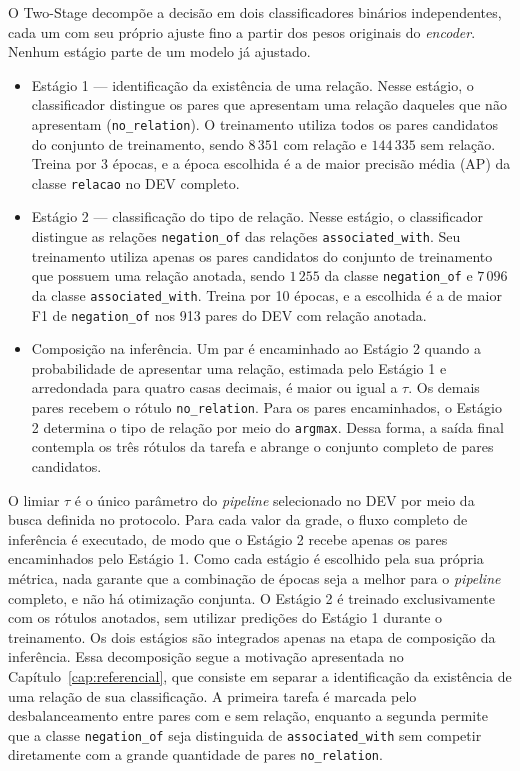 O Two-Stage decompõe a decisão em dois classificadores binários independentes, cada
um com seu próprio ajuste fino a partir dos pesos originais do
\emph{encoder}. Nenhum estágio parte de um modelo já ajustado.

\begin{itemize}
  \item Estágio 1 --- identificação da existência de uma relação. Nesse estágio, o classificador distingue os pares que apresentam uma relação daqueles que não apresentam (\texttt{no\_relation}). O treinamento utiliza todos os pares candidatos do conjunto de treinamento, sendo $8\,351$ com relação e $144\,335$ sem relação. Treina por 3 épocas, e a
        época escolhida é a de maior precisão média (AP) da classe \texttt{relacao}
        no DEV completo.
  \item Estágio 2 --- classificação do tipo de relação. Nesse estágio, o classificador distingue as relações \texttt{negation\_of} das relações \texttt{associated\_with}. Seu treinamento utiliza apenas os pares candidatos do conjunto de treinamento que possuem uma relação anotada, sendo $1\,255$ da classe \texttt{negation\_of} e $7\,096$ da classe \texttt{associated\_with}. Treina por 10 épocas, e a escolhida é
        a de maior F1 de \texttt{negation\_of} nos 913 pares do DEV com relação
        anotada.
  \item Composição na inferência. Um par é encaminhado ao Estágio 2 quando a probabilidade de apresentar uma relação, estimada pelo Estágio 1 e arredondada para quatro casas decimais, é maior ou igual a $\tau$. Os demais pares recebem o rótulo \texttt{no\_relation}. Para os pares encaminhados, o Estágio 2 determina o tipo de relação por meio do \texttt{argmax}. Dessa forma, a saída final contempla os três rótulos da tarefa e abrange o conjunto completo de pares candidatos.
\end{itemize}

O limiar $\tau$ é o único parâmetro do \emph{pipeline} selecionado no DEV por meio da busca definida no protocolo. Para cada valor da grade, o fluxo completo de inferência é executado, de modo que o Estágio 2 recebe apenas os pares encaminhados pelo Estágio 1. Como cada estágio é escolhido pela sua própria métrica, nada
garante que a combinação de épocas seja a melhor para o \emph{pipeline} completo, e
não há otimização conjunta. O Estágio 2 é treinado exclusivamente com os rótulos anotados, sem utilizar predições do Estágio 1 durante o treinamento. Os dois estágios são integrados apenas na etapa de composição da inferência. Essa decomposição segue a motivação apresentada no Capítulo~\ref{cap:referencial}, que consiste em separar a identificação da existência de uma relação de sua classificação. A primeira tarefa é marcada pelo desbalanceamento entre pares com e sem relação, enquanto a segunda permite que a classe \texttt{negation\_of} seja distinguida de \texttt{associated\_with} sem competir diretamente com a grande quantidade de pares \texttt{no\_relation}.

